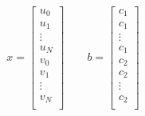 \begin{equation}
x = 
\left[
\begin{array}{c}
u_0 \\
u_1 \\
\vdots \\
u_N \\
v_0 \\
v_1 \\
\vdots \\
v_N \\
\end{array}
\right]
\qquad
b =
\left[
\begin{array}{c}
c_1 \\
c_1 \\
\vdots \\
c_1 \\
c_2 \\
c_2 \\
\vdots\\
c_2 \\
\end{array}
\right]
\label{eq:c-b_matrix}
\end{equation}


